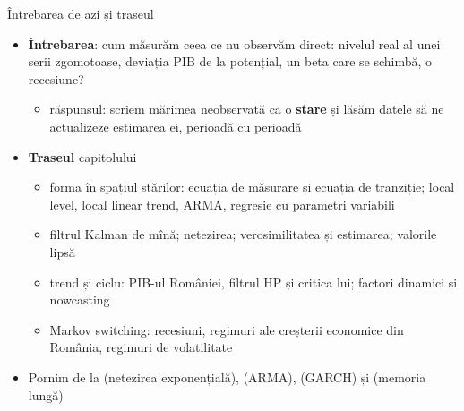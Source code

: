 \begin{frame}{Întrebarea de azi și traseul}
\itemsize{\small}
\begin{itemize}
    \item \textbf{Întrebarea}: cum măsurăm ceea ce nu observăm direct: nivelul real al unei serii zgomotoase, deviația PIB de la potențial, un beta care se schimbă, o recesiune?
    \begin{itemize}
        \item răspunsul: scriem mărimea neobservată ca o \textbf{stare} și lăsăm datele să ne actualizeze estimarea ei, perioadă cu perioadă
    \end{itemize}
    \item \textbf{Traseul} capitolului
    \begin{itemize}
        \item forma în spațiul stărilor: ecuația de măsurare și ecuația de tranziție; local level, local linear trend, ARMA, regresie cu parametri variabili
        \item filtrul Kalman de mînă; netezirea; verosimilitatea și estimarea; valorile lipsă
        \item trend și ciclu: PIB-ul României, filtrul HP și critica lui; factori dinamici și nowcasting
        \item Markov switching: recesiuni, regimuri ale creșterii economice din România, regimuri de volatilitate
    \end{itemize}
    \item Pornim de la  (netezirea exponențială),  (ARMA),  (GARCH) și  (memoria lungă)
\end{itemize}
\end{frame}

